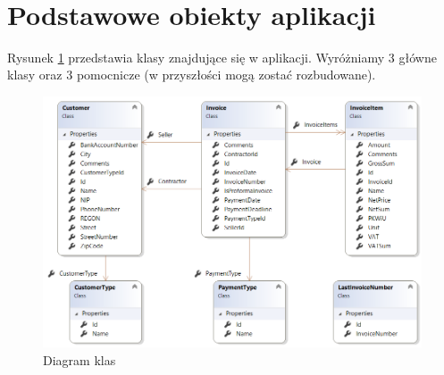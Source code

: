 \newpage ~\newpage
\section{Podstawowe obiekty aplikacji\label{AppObjects}}
Rysunek \ref{fig:classDiagram} przedstawia klasy znajdujące się w aplikacji. Wyróżniamy 3 główne klasy oraz 3 pomocnicze (w przyszłości mogą zostać rozbudowane). 

\begin{figure}[ht!]
  \includegraphics[width=\linewidth]{Rysunki/ClassDiagram.png}
  \caption{Diagram klas}
  \label{fig:classDiagram}
\end{figure}


